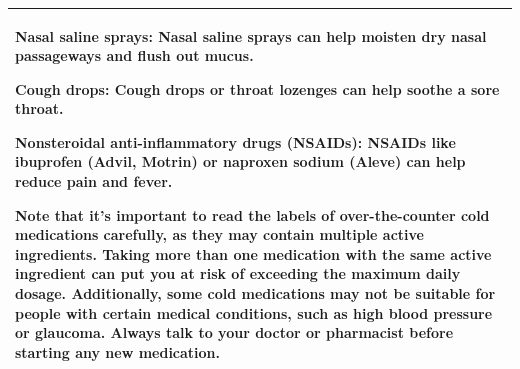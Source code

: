 \begin{table}[t]
\begin{tabular}{l}
\begin{minipage}{45em}
\begin{lmttfont}
Nasal saline sprays: Nasal saline sprays can help moisten dry nasal passageways and flush out mucus.

Cough drops: Cough drops or throat lozenges can help soothe a sore throat.

Nonsteroidal anti-inflammatory drugs (NSAIDs): NSAIDs like ibuprofen (Advil, Motrin) or naproxen sodium (Aleve) can help reduce pain and fever.

Note that it's important to read the labels of over-the-counter cold medications carefully, as they may contain multiple active ingredients. Taking more than one medication with the same active ingredient can put you at risk of exceeding the maximum daily dosage. Additionally, some cold medications may not be suitable for people with certain medical conditions, such as high blood pressure or glaucoma. Always talk to your doctor or pharmacist before starting any new medication.  
\end{lmttfont}
\end{minipage}\\
    \bottomrule
  \end{tabular}

\end{table}

